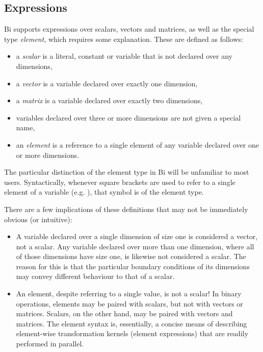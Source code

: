 \subsection{Expressions\label{Expressions}}

Bi supports expressions over scalars, vectors and matrices, as well as the
special type \textit{element}, which requires some explanation. These are
defined as follows:
\begin{itemize}
\item a \textit{scalar} is a literal, constant or variable that
  is not declared over any dimensions,
\item a \textit{vector} is a variable declared over
  exactly one dimension,
\item a \textit{matrix} is a variable declared over exactly two
  dimensions,
\item variables declared over three or more dimensions are not given a special
  name,
\item an \textit{element} is a reference to a single element of any
  variable declared over one or more dimensions.
\end{itemize}

The particular distinction of the element type in Bi will be unfamiliar to
most users. Syntactically, whenever square brackets are used to refer to a
single element of a variable (e.g. ), that symbol is of the
element type.

There are a few implications of these definitions that may not be immediately
obvious (or intuitive):
\begin{itemize}
\item A variable declared over a single dimension of size one is considered a
  vector, not a scalar. Any variable declared over more than one dimension,
  where all of those dimensions have size one, is likewise not considered a
  scalar. The reason for this is that the particular boundary conditions of
  its dimensions may convey different behaviour to that of a scalar.

\item An element, despite referring to a single value, is not a scalar! In
  binary operations, elements may be paired with scalars, but not with vectors
  or matrices. Scalars, on the other hand, may be paired with vectors and
  matrices. The element syntax is, essentially, a concise means of describing
  element-wise transformation kernels (element expressions) that are readily performed in parallel.

\end{itemize}

